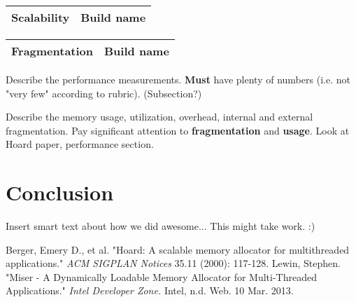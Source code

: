 \documentclass{article}
\begin{document}
\begin{center}
    \footnotesize
    \begin{tabular}{ | r | l | }
    \hline
    Scalability & Build name  \\
    \hline
    
    \hline
\end{tabular}
\end{center}

\begin{center}
    \footnotesize
    \begin{tabular}{ | r | l | }
    \hline
    Fragmentation & Build name   \\
    \hline
    
    \hline
\end{tabular}
\end{center}


Describe the performance measurements. \textbf{Must} have plenty of numbers 
(i.e. not "very few" according to rubric). (Subsection?)

Describe the memory usage, utilization, overhead, internal and external 
fragmentation. Pay significant attention to \textbf{fragmentation} and 
\textbf{usage}. Look at Hoard paper, performance section. 

\newpage
\section{Conclusion}
\label{sec:conclusion}

Insert smart text about how we did awesome... This might take work. :)

\newpage

\begin{thebibliography}{9}
	
		Berger, Emery D., et al.
		"Hoard: A scalable memory allocator for multithreaded applications."
		\textit{ACM SIGPLAN Notices} 35.11 
		(2000): 
		117-128.
		Lewin, Stephen.
		"Miser - A Dynamically Loadable Memory Allocator for Multi-Threaded Applications."
		\textit{Intel Developer Zone.}
		Intel, 
		n.d. Web. 10 Mar. 2013.

\end{thebibliography}
\end{document}
